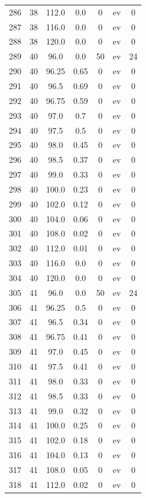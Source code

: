 \documentclass[12pt,a4paper]{article}
\begin{document}
\begin{tabular}{r|cccccc}
	286 & 38 & 112.0 & 0.0 & 0 & ev & 0 \\
	287 & 38 & 116.0 & 0.0 & 0 & ev & 0 \\
	288 & 38 & 120.0 & 0.0 & 0 & ev & 0 \\
	289 & 40 & 96.0 & 0.0 & 50 & ev & 24 \\
	290 & 40 & 96.25 & 0.65 & 0 & ev & 0 \\
	291 & 40 & 96.5 & 0.69 & 0 & ev & 0 \\
	292 & 40 & 96.75 & 0.59 & 0 & ev & 0 \\
	293 & 40 & 97.0 & 0.7 & 0 & ev & 0 \\
	294 & 40 & 97.5 & 0.5 & 0 & ev & 0 \\
	295 & 40 & 98.0 & 0.45 & 0 & ev & 0 \\
	296 & 40 & 98.5 & 0.37 & 0 & ev & 0 \\
	297 & 40 & 99.0 & 0.33 & 0 & ev & 0 \\
	298 & 40 & 100.0 & 0.23 & 0 & ev & 0 \\
	299 & 40 & 102.0 & 0.12 & 0 & ev & 0 \\
	300 & 40 & 104.0 & 0.06 & 0 & ev & 0 \\
	301 & 40 & 108.0 & 0.02 & 0 & ev & 0 \\
	302 & 40 & 112.0 & 0.01 & 0 & ev & 0 \\
	303 & 40 & 116.0 & 0.0 & 0 & ev & 0 \\
	304 & 40 & 120.0 & 0.0 & 0 & ev & 0 \\
	305 & 41 & 96.0 & 0.0 & 50 & ev & 24 \\
	306 & 41 & 96.25 & 0.5 & 0 & ev & 0 \\
	307 & 41 & 96.5 & 0.34 & 0 & ev & 0 \\
	308 & 41 & 96.75 & 0.41 & 0 & ev & 0 \\
	309 & 41 & 97.0 & 0.45 & 0 & ev & 0 \\
	310 & 41 & 97.5 & 0.41 & 0 & ev & 0 \\
	311 & 41 & 98.0 & 0.33 & 0 & ev & 0 \\
	312 & 41 & 98.5 & 0.33 & 0 & ev & 0 \\
	313 & 41 & 99.0 & 0.32 & 0 & ev & 0 \\
	314 & 41 & 100.0 & 0.25 & 0 & ev & 0 \\
	315 & 41 & 102.0 & 0.18 & 0 & ev & 0 \\
	316 & 41 & 104.0 & 0.13 & 0 & ev & 0 \\
	317 & 41 & 108.0 & 0.05 & 0 & ev & 0 \\
	318 & 41 & 112.0 & 0.02 & 0 & ev & 0 \\

\end{tabular}
\end{document}
